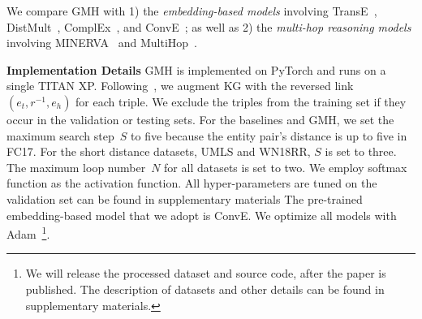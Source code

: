 We compare GMH %
 with
 1) the \textit{embedding-based models} involving
TransE~\cite{bordes2013translating}, DistMult~\cite{yang2014embedding}, ComplEx~\cite{trouillon2017complex}, and ConvE~\cite{Dettmers2018Convolutional};
as well as 
2) the \textit{multi-hop reasoning models} involving MINERVA~\cite{das2017go} and MultiHop~\cite{LinEMNLP2018}.



\noindent\textbf{Implementation Details}
\label{sec:implementation}
GMH is implemented on PyTorch and runs
on a single TITAN XP. Following~\cite{das2017go}, we augment KG with the reversed link $(e_{t},r^{-1},e_{h})$ for each triple.
We exclude the triples from the training set if they occur in the validation or testing sets.
For the baselines and GMH, we set the maximum search step~$S$ to five because the entity pair's distance is up to five in FC17.
For the short distance datasets, UMLS and WN18RR, $S$ is set to three.
The maximum loop number~$N$ for all datasets is set to two.
We employ softmax function as the activation function.
All hyper-parameters are tuned on the validation set can be found in supplementary materials 
The pre-trained embedding-based model that we adopt is ConvE.
We optimize all models with Adam~\cite{adam}\footnote{We will release the processed dataset and source code, after the paper is published.
The description of datasets and other details can be found in supplementary materials. 
}.


